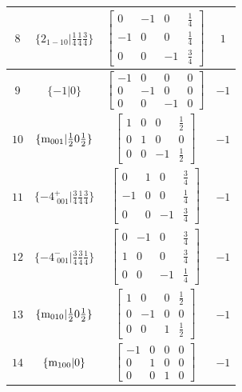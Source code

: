 \documentclass[fleqn,8pt]{jsarticle}
\begin{document}
\begin{longtable}{cccc}
$ 8 $ & $ \{2{}_{1-10}|\frac{1}{4} \frac{1}{4} \frac{3}{4}\} $ & $ \begin{bmatrix} 0 & -1 & 0 & \frac{1}{4} \\ -1 & 0 & 0 & \frac{1}{4} \\ 0 & 0 & -1 & \frac{3}{4} \end{bmatrix} $ & $ 1 $ \\ \hline
$ 9 $ & $ \{-1|0\} $ & $ \begin{bmatrix} -1 & 0 & 0 & 0 \\ 0 & -1 & 0 & 0 \\ 0 & 0 & -1 & 0 \end{bmatrix} $ & $ -1 $ \\ \hline
$ 10 $ & $ \{{\rm m}_{001}|\frac{1}{2} 0 \frac{1}{2}\} $ & $ \begin{bmatrix} 1 & 0 & 0 & \frac{1}{2} \\ 0 & 1 & 0 & 0 \\ 0 & 0 & -1 & \frac{1}{2} \end{bmatrix} $ & $ -1 $ \\ \hline
$ 11 $ & $ \{-4^{+}_{\,\,001}|\frac{3}{4} \frac{1}{4} \frac{3}{4}\} $ & $ \begin{bmatrix} 0 & 1 & 0 & \frac{3}{4} \\ -1 & 0 & 0 & \frac{1}{4} \\ 0 & 0 & -1 & \frac{3}{4} \end{bmatrix} $ & $ -1 $ \\ \hline
$ 12 $ & $ \{-4^{-}_{\,\,001}|\frac{3}{4} \frac{3}{4} \frac{1}{4}\} $ & $ \begin{bmatrix} 0 & -1 & 0 & \frac{3}{4} \\ 1 & 0 & 0 & \frac{3}{4} \\ 0 & 0 & -1 & \frac{1}{4} \end{bmatrix} $ & $ -1 $ \\ \hline
$ 13 $ & $ \{{\rm m}_{010}|\frac{1}{2} 0 \frac{1}{2}\} $ & $ \begin{bmatrix} 1 & 0 & 0 & \frac{1}{2} \\ 0 & -1 & 0 & 0 \\ 0 & 0 & 1 & \frac{1}{2} \end{bmatrix} $ & $ -1 $ \\ \hline
$ 14 $ & $ \{{\rm m}_{100}|0\} $ & $ \begin{bmatrix} -1 & 0 & 0 & 0 \\ 0 & 1 & 0 & 0 \\ 0 & 0 & 1 & 0 \end{bmatrix} $ & $ -1 $ \\ \hline

\end{longtable}
\end{document}
